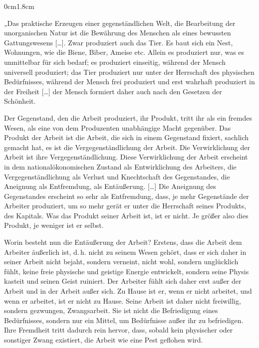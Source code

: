 \documentclass[a4paper, 11pt, parskip=half]{scrartcl}
\begin{document}
\begin{adjustwidth}{0cm}{1.8cm}
\normalsize\linespread{1.10}\selectfont
\begin{linenumbers}
\noindent „Das praktische Erzeugen einer gegenständlichen Welt, die Bearbeitung der unorganischen Natur ist die Bewährung des Menschen als eines bewussten Gattungswesens [\dots]. Zwar produziert auch das Tier. Es baut sich ein Nest, Wohnungen, wie die Biene, Biber, Ameise etc. Allein es produziert nur, was es unmittelbar für sich bedarf; es produziert einseitig, während der Mensch universell produziert; das Tier produziert nur unter der Herrschaft des physischen Bedürfnisses, während der Mensch frei produziert und erst wahrhaft produziert in der Freiheit [\dots] der Mensch formiert daher auch nach den Gesetzen der Schönheit.

\vspace{0.25cm}
\noindent Der Gegenstand, den die Arbeit produziert, ihr Produkt, tritt ihr als ein fremdes Wesen, als eine von dem Produzenten unabhängige Macht gegenüber. Das Produkt der Arbeit ist die Arbeit, die sich in einem Gegenstand fixiert, sachlich gemacht hat, es ist die Vergegenständlichung der Arbeit. Die Verwirklichung der Arbeit ist ihre Vergegenständlichung. Diese Verwirklichung der Arbeit erscheint in dem nationalökonomischen Zustand als Entwirklichung des Arbeiters, die Vergegenständlichung als Verlust und Knechtschaft des Gegenstandes, die Aneignung als Entfremdung, als Entäußerung. [\dots] Die Aneignung des Gegenstandes erscheint so sehr als Entfremdung, dass, je mehr Gegenstände der Arbeiter produziert, um so mehr gerät er unter die Herrschaft seines Produkts, des Kapitals. Was das Produkt seiner Arbeit ist, ist er nicht. Je größer also dies Produkt, je weniger ist er selbst.

\vspace{0.25cm}
\noindent Worin besteht nun die Entäußerung der Arbeit? Erstens, dass die Arbeit dem Arbeiter äußerlich ist, d.\,h. nicht zu seinem Wesen gehört, dass er sich daher in seiner Arbeit nicht bejaht, sondern verneint, nicht wohl, sondern unglücklich fühlt, keine freie physische und geistige Energie entwickelt, sondern seine Physis kasteit und seinen Geist ruiniert. Der Arbeiter fühlt sich daher erst außer der Arbeit und in der Arbeit außer sich. Zu Hause ist er, wenn er nicht arbeitet, und wenn er arbeitet, ist er nicht zu Hause. Seine Arbeit ist daher nicht freiwillig, sondern gezwungen, Zwangsarbeit. Sie ist nicht die Befriedigung eines Bedürfnisses, sondern nur ein Mittel, um Bedürfnisse außer ihr zu befriedigen. Ihre Fremdheit tritt dadurch rein hervor, dass, sobald kein physischer oder sonstiger Zwang existiert, die Arbeit wie eine Pest geflohen wird.


\end{linenumbers}
\end{adjustwidth}
\end{document}
